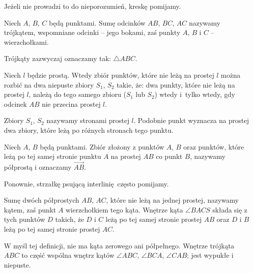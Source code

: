 Jeżeli nie prowadzi to do nieporozumień, kreskę pomijamy.

\begin{definition}[trójkąt]
    Niech $A$, $B$, $C$ będą punktami.
    Sumę odcinków $AB$, $BC$, $AC$ nazywamy trójkątem, wspomniane odcinki -- jego bokami, zaś punkty $A$, $B$ i $C$ -- wierzchołkami.
\end{definition} %

Trójkąty zazwyczaj oznaczamy tak: $\triangle ABC$.

\begin{proposition}
    Niech $l$ będzie prostą.
    Wtedy zbiór punktów, które nie leżą na prostej $l$ można rozbić na dwa niepuste zbiory $S_1$, $S_2$ takie, że: dwa punkty, które nie leżą na prostej $l$, należą do tego samego zbioru ($S_1$ lub $S_2$) wtedy i~tylko wtedy, gdy odcinek $AB$ nie przecina prostej $l$.
\end{proposition} %

Zbiory $S_1$, $S_2$ nazywamy stronami prostej $l$.
Podobnie punkt wyznacza na prostej dwa zbiory, które leżą po różnych stronach tego punktu.

\begin{definition}[półprosta]
    Niech $A$, $B$ będą punktami.
    Zbiór złożony z punktów $A$, $B$ oraz punktów, które leżą po tej samej stronie punktu $A$ na prostej $AB$ co punkt $B$, nazywamy półprostą i oznaczamy $\overrightarrow{AB}$.
\end{definition} %

Ponownie, strzałkę psującą interlinię często pomijamy.

\begin{definition}[kąt]
    Sumę dwóch półprostych $AB$, $AC$, które nie leżą na jednej prostej, nazywamy kątem, zaś punkt $A$ wierzchołkiem tego kąta.
    Wnętrze kąta $\angle BACS$ składa się z tych punktów $D$ takich, że $D$ i $C$ leżą po tej samej stronie prostej $AB$ oraz $D$ i $B$ leżą po tej samej stronie prostej $AC$.
\end{definition} %

W myśl tej definicji, nie ma kąta zerowego ani półpełnego.
Wnętrze trójkąta $ABC$ to część wspólna wnętrz kątów $\angle ABC$, $\angle BCA$, $\angle CAB$; jest wypukłe i niepuste.

%